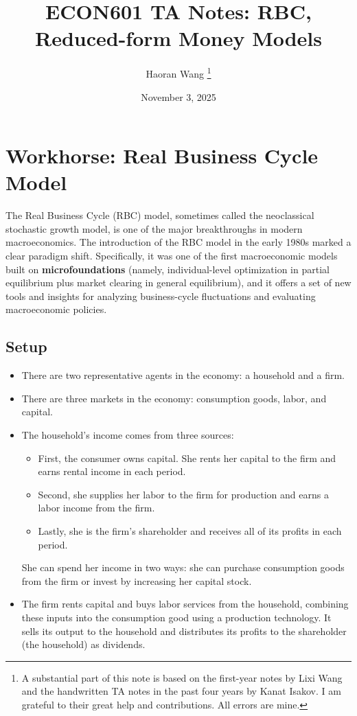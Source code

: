 \documentclass[12pt]{article}
\title{ECON601 TA Notes: RBC, Reduced-form Money Models}
\author{Haoran Wang \thanks{A substantial part of this note is based on the first-year notes by Lixi Wang and the handwritten TA notes in the past four years by Kanat Isakov. I am grateful to their great help and contributions. All errors are mine.}}
\date{November 3, 2025}
\begin{document}
	\maketitle
	
	\tableofcontents
	
	\section{Workhorse: Real Business Cycle Model}
	The Real Business Cycle (RBC) model, sometimes called the neoclassical stochastic growth model, is one of the major breakthroughs in modern macroeconomics. The introduction of the RBC model in the early 1980s marked a clear paradigm shift. Specifically, it was one of the first macroeconomic models built on \textbf{microfoundations} (namely, individual-level optimization in partial equilibrium plus market clearing in general equilibrium), and it offers a set of new tools and insights for analyzing business-cycle fluctuations and evaluating macroeconomic policies. 
	
	\subsection{Setup}
	\begin{itemize}
		\item There are two representative agents in the economy: a household and a firm. 
		\item There are three markets in the economy: consumption goods, labor, and capital.
		\item The household's income comes from three sources: 
		\begin{itemize}
			\item First, the consumer owns capital. She rents her capital to the firm and earns rental income in each period. 
			\item Second, she supplies her labor to the firm for production and earns a labor income from the firm.
			\item Lastly, she is the firm's shareholder and receives all of its profits in each period.
		\end{itemize}
	   She can spend her income in two ways: she can purchase consumption goods from the firm or invest by increasing her capital stock.
	  \item The firm rents capital and buys labor services from the household, combining these inputs into the consumption good using a production technology. It sells its output to the household and distributes its profits to the shareholder (the household) as dividends.
	\end{itemize}
	
\end{document}

